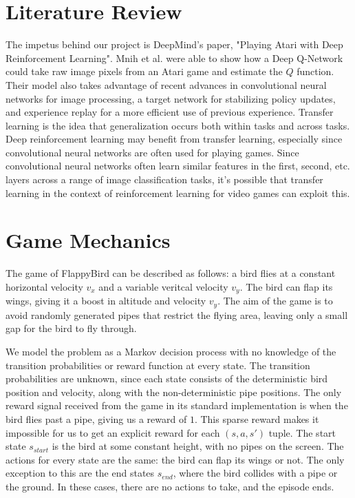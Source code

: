 \documentclass{article}
\begin{document}
\section{Literature Review}
The impetus behind our project is DeepMind's paper, "Playing Atari with Deep Reinforcement Learning". Mnih et al. were able to show how a Deep Q-Network could take raw image pixels from an Atari game and estimate the $Q$ function. \cite{deepmind}
Their model also takes advantage of recent advances in convolutional neural networks for image processing, a target network for stabilizing policy updates, and experience replay for a more efficient use of previous experience.
Transfer learning is the idea that generalization occurs both within tasks and across tasks. \cite{transfer}
Deep reinforcement learning may benefit from transfer learning, especially since convolutional neural networks are often used for playing games.
Since convolutional neural networks often learn similar features in the first, second, etc. layers across a range of image classification tasks, it's possible that transfer learning in the context of reinforcement learning for video games can exploit this.

\section{Game Mechanics}

The game of FlappyBird can be described as follows: a bird flies at a constant horizontal velocity $v_x$ and a variable veritcal velocity $v_y$. 
The bird can flap its wings, giving it a boost in altitude and velocity $v_y$.
The aim of the game is to avoid randomly generated pipes that restrict the flying area, leaving only a small gap for the bird to fly through. 

We model the problem as a Markov decision process with no knowledge of the transition probabilities or reward function at every state.
The transition probabilities are unknown, since each state consists of the deterministic bird position and velocity, along with the non-deterministic pipe positions.
The only reward signal received from the game in its standard implementation is when the bird flies past a pipe, giving us a reward of $1$. 
This sparse reward makes it impossible for us to get an explicit reward for each $(s, a, s')$ tuple.
The start state $s_{start}$ is the bird at some constant height, with no pipes on the screen.
The actions for every state are the same: the bird can flap its wings or not.
The only exception to this are the end states $s_{end}$, where the bird collides with a pipe or the ground.
In these cases, there are no actions to take, and the episode ends.
\end{document}

